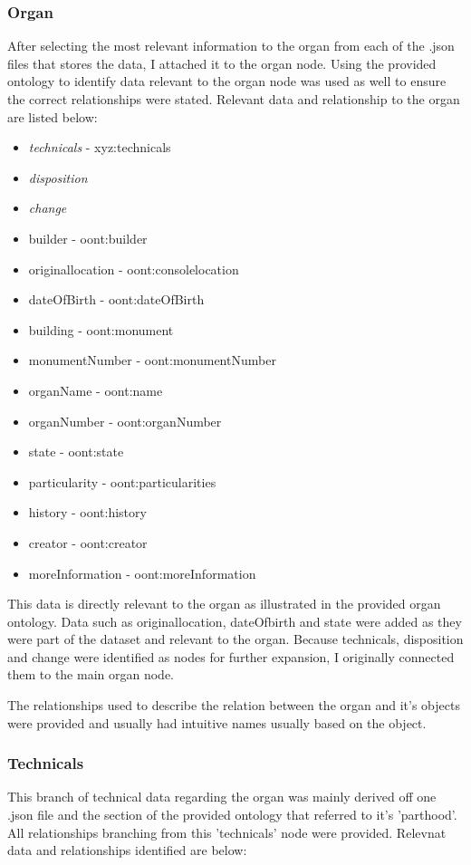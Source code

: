 \subsubsection{Organ}
\hspace*{0.5cm} After selecting the most relevant information to the organ from each of the .json files that stores the data, I attached it to the organ node. Using the provided ontology to identify data relevant to the organ node was used as well to ensure the correct relationships were stated. Relevant data and relationship to the organ are listed below:

\begin{itemize}
    \item \textit{technicals} - xyz:technicals
    \item \textit{disposition}
    \item \textit{change}
    \item builder - oont:builder
    \item originallocation - oont:consolelocation
    \item dateOfBirth - oont:dateOfBirth
    \item building - oont:monument
    \item monumentNumber - oont:monumentNumber
    \item organName - oont:name
    \item organNumber - oont:organNumber 
    \item state - oont:state 
    \item particularity - oont:particularities
    \item history - oont:history
    \item creator - oont:creator
    \item moreInformation - oont:moreInformation 
\end{itemize}

This data is directly relevant to the organ as illustrated in the provided organ ontology. Data such as originallocation, dateOfbirth and state were added as they were part of the dataset and relevant to the organ. Because technicals, disposition and change were identified as nodes for further expansion, I originally connected them to the main organ node. 

The relationships used to describe the relation between the organ and it's objects were provided and usually had intuitive names usually based on the object. 

\subsubsection{Technicals}
\hspace*{0.5cm} This branch of technical data regarding the organ was mainly derived off one .json file and the section of the provided ontology that referred to it's 'parthood'. All relationships branching from this 'technicals' node were provided. Relevnat data and relationships identified are below:


